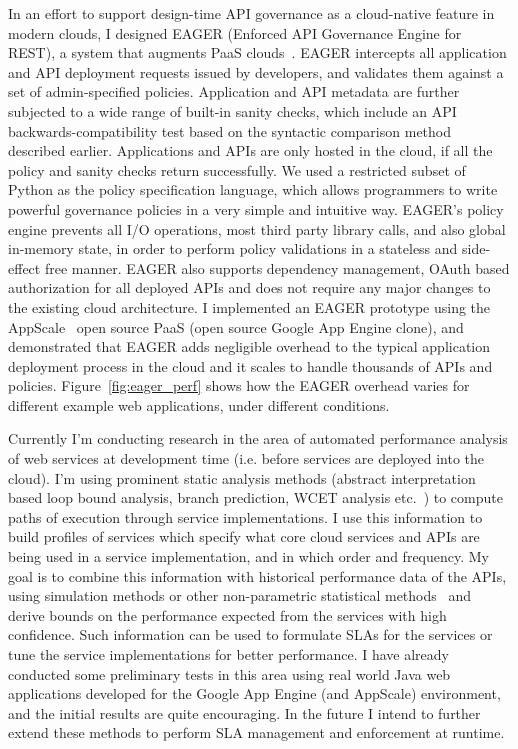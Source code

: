 In an effort to support design-time API governance as a cloud-native feature in 
modern clouds, I designed EAGER (Enforced API Governance Engine for REST), a 
system that augments PaaS clouds~\cite{6903538}. EAGER intercepts all application and API 
deployment requests issued by developers, and validates them against a set of 
admin-specified policies. Application and API metadata are further subjected to a wide 
range of built-in sanity checks, which include an API backwards-compatibility test based 
on the syntactic comparison method described earlier. Applications and APIs are only 
hosted in the cloud, if all the policy and sanity checks return successfully. We used a 
restricted subset of Python as the policy specification language, which allows programmers 
to write powerful governance policies in a very simple and intuitive way. EAGER's policy engine 
prevents all I/O operations, most third party library calls, and also global in-memory state, in 
order to perform policy validations in a stateless and side-effect free manner. EAGER also 
supports dependency management, OAuth based authorization for all deployed APIs and does 
not require any major changes to the existing cloud architecture. I implemented an EAGER 
prototype using the AppScale~\cite{krintzappscale13} open source PaaS (open source Google App Engine clone), 
and demonstrated that EAGER adds negligible overhead to the typical application deployment 
process in the cloud and it scales to handle thousands of APIs and policies. Figure~\ref{fig:eager_perf}
shows how the EAGER overhead varies for different example web applications, under different
conditions.

Currently I'm conducting research in the area of automated performance analysis of web
services at development time (i.e. before services are deployed into the cloud). I'm using
prominent static analysis methods (abstract interpretation based loop bound analysis,
branch prediction, WCET analysis etc.~\cite{ermedahl_et_al:OASIcs:2007:1194,Yeh:1991:TAT:123465.123475,bygde2010static}) 
to compute paths of execution through service 
implementations. I use this information to build profiles of services which
specify what core cloud services and APIs are being used in a service implementation,
and in which order and frequency. My goal is to combine this information with historical
performance data of the APIs, using simulation methods or other non-parametric statistical
methods~\cite{Nurmi:2007:QQB:1791551.1791556} and derive bounds on the performance expected from the services with high
confidence. 
Such information can be used to formulate SLAs for the services or tune
the service implementations for better performance. 
I have already conducted some preliminary tests in this area using real world
Java web applications developed for the Google App Engine (and AppScale) environment,
and the initial results are quite encouraging.
In the future I intend to further extend 
these methods to perform SLA management and enforcement at runtime.